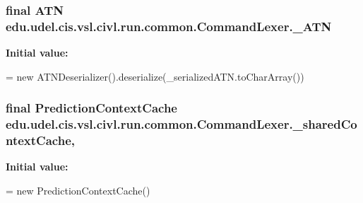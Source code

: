 \subsubsection[{\+\_\+\+A\+T\+N}]{\setlength{\rightskip}{0pt plus 5cm}final A\+T\+N edu.\+udel.\+cis.\+vsl.\+civl.\+run.\+common.\+Command\+Lexer.\+\_\+\+A\+T\+N\hspace{0.3cm}{\ttfamily [static]}}\label{classedu_1_1udel_1_1cis_1_1vsl_1_1civl_1_1run_1_1common_1_1CommandLexer_a21693aff18f91aef74c61b123e127710}
{\bfseries Initial value\+:}
\begin{DoxyCode}
=
        \textcolor{keyword}{new} ATNDeserializer().deserialize(\_serializedATN.toCharArray())
\end{DoxyCode}
\hypertarget{classedu_1_1udel_1_1cis_1_1vsl_1_1civl_1_1run_1_1common_1_1CommandLexer_a76f16a9ace1b5290c4cff4498674835e}{}
\subsubsection[{\+\_\+shared\+Context\+Cache}]{\setlength{\rightskip}{0pt plus 5cm}final Prediction\+Context\+Cache edu.\+udel.\+cis.\+vsl.\+civl.\+run.\+common.\+Command\+Lexer.\+\_\+shared\+Context\+Cache\hspace{0.3cm}{\ttfamily [static]}, {\ttfamily [protected]}}\label{classedu_1_1udel_1_1cis_1_1vsl_1_1civl_1_1run_1_1common_1_1CommandLexer_a76f16a9ace1b5290c4cff4498674835e}
{\bfseries Initial value\+:}
\begin{DoxyCode}
=
        \textcolor{keyword}{new} PredictionContextCache()
\end{DoxyCode}
\hypertarget{classedu_1_1udel_1_1cis_1_1vsl_1_1civl_1_1run_1_1common_1_1CommandLexer_af4e4495b0a453fdc8ec5171522a22005}{}
